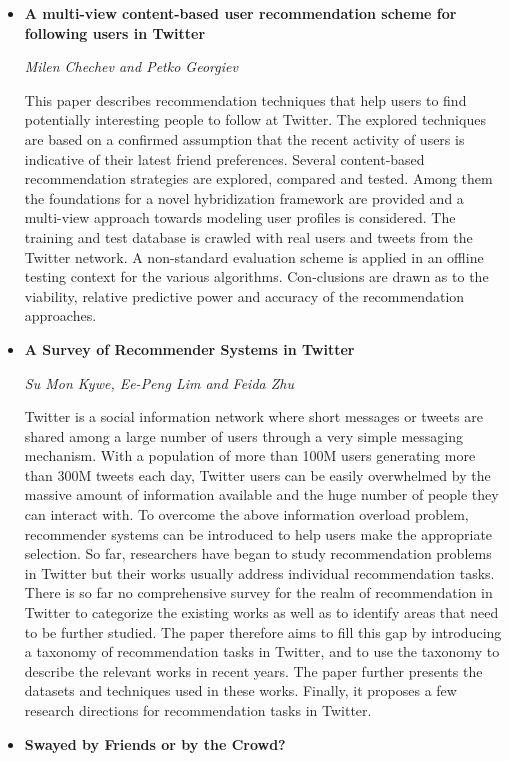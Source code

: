 \documentclass[a4paper,12pt,svgnames]{report}
\begin{document}
\begin{itemize}
\item \textbf{A multi-view content-based user recommendation scheme for
following users in Twitter}

\textit{Milen Chechev and Petko Georgiev}

This paper describes recommendation techniques that help users to find
potentially interesting people to follow at Twitter. The explored techniques are
based on a confirmed assumption that the recent activity of users is indicative
of their latest friend preferences. Several content-based recommendation
strategies are explored, compared and tested. Among them the foundations for a
novel hybridization framework are provided and a multi-view approach towards
modeling user profiles is considered. The training and test database is crawled
with real users and tweets from the Twitter network. A non-standard evaluation
scheme is applied in an offline testing context for the various algorithms.
Con-clusions are drawn as to the viability, relative predictive power and
accuracy of the recommendation approaches. 

\item \textbf{A Survey of Recommender Systems in Twitter}

\textit{Su Mon Kywe, Ee-Peng Lim and Feida Zhu}

Twitter is a social information network where short messages or tweets are
shared among a large number of users through a very simple messaging mechanism.
With a population of more than 100M users generating more than 300M tweets each
day, Twitter users can be easily overwhelmed by the massive amount of
information available and the huge number of people they can interact with. To
overcome the above information overload problem, recommender systems can be
introduced to help users make the appropriate selection. So far, researchers
have began to study recommendation problems in Twitter but their works usually
address individual recommendation tasks. There is so far no comprehensive survey
for the realm of recommendation in Twitter to categorize the existing works as
well as to identify areas that need to be further studied. The paper therefore
aims to fill this gap by introducing a taxonomy of recommendation tasks in
Twitter, and to use the taxonomy to describe the relevant works in recent years.
The paper further presents the datasets and techniques used in these works.
Finally, it proposes a few research directions for recommendation tasks in
Twitter.

\item \textbf{Swayed by Friends or by the Crowd?}


\end{itemize}
\end{document}
